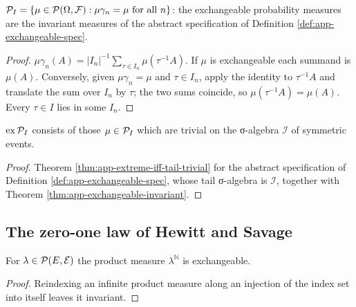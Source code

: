 \begin{theorem}[Georgii (7.16)]
    \label{thm:app-exchangeable-invariant}
    \leanok

    $\mathcal{P}_I = \left\{ \mu \in \mathcal{P}(\Omega, \mathcal{F}) : \mu\gamma_n = \mu \text{ for all }
    n \right\}$: the exchangeable probability measures are the invariant measures of the abstract
    specification of Definition \ref{def:app-exchangeable-spec}.
\end{theorem}
\begin{proof}
    \leanok

    $\mu\gamma_n(A) = |I_n|^{-1}\sum_{\tau \in I_n} \mu(\tau^{-1}A)$.  If $\mu$ is
    exchangeable each summand is $\mu(A)$.  Conversely, given $\mu\gamma_n = \mu$ and
    $\tau \in I_n$, apply the identity to $\tau^{-1}A$ and translate the sum over $I_n$ by
    $\tau$; the two sums coincide, so $\mu(\tau^{-1}A) = \mu(A)$.  Every $\tau \in I$ lies in
    some $I_n$.
\end{proof}

\begin{corollary}
    \label{cor:app-extreme-exchangeable}
    \leanok

    $\mathrm{ex}\,\mathcal{P}_I$ consists of those $\mu \in \mathcal{P}_I$ which are trivial on the
    σ-algebra $\mathcal{I}$ of symmetric events.
\end{corollary}
\begin{proof}
    \leanok

    Theorem \ref{thm:app-extreme-iff-tail-trivial} for the abstract specification of
    Definition \ref{def:app-exchangeable-spec}, whose tail σ-algebra is $\mathcal{I}$, together
    with Theorem \ref{thm:app-exchangeable-invariant}.
\end{proof}

\subsection*{The zero-one law of Hewitt and Savage}

\begin{lemma}
    \label{lem:app-iid-exchangeable}
    \leanok

    For $\lambda \in \mathcal{P}(E, \mathcal{E})$ the product measure $\lambda^{\mathbb{N}}$ is
    exchangeable.
\end{lemma}
\begin{proof}
    \leanok

    Reindexing an infinite product measure along an injection of the index set into itself
    leaves it invariant.
\end{proof}

